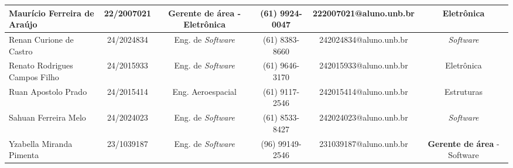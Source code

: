 \begin{landscape}
\begin{table}[htbp]
{\begin{tabular}{|l|c|c|c|c|c|}
Maurício Ferreira de Araújo & 22/2007021 & \textbf{Gerente de área} - Eletrônica & (61) 9924-0047 & 222007021@aluno.unb.br & Eletrônica\\ \hline
Renan Curione de Castro & 24/2024834 & Eng. de \textit{Software} & (61) 8383-8660 & 242024834@aluno.unb.br & \textit{Software}\\ \hline
Renato Rodrigues Campos Filho & 24/2015933 & Eng. de \textit{Software} & (61) 9646-3170 & 242015933@aluno.unb.br & Eletrônica\\ \hline
Ruan Apostolo Prado & 24/2015414 & Eng. Aeroespacial & (61) 9117-2546 & 242015414@aluno.unb.br & Estruturas\\ \hline
Sahuan Ferreira Melo & 24/2024023 & Eng. de \textit{Software} & (61) 8533-8427 & 242024023@aluno.unb.br & \textit{Software}\\ \hline
Yzabella Miranda Pimenta & 23/1039187 & Eng. de \textit{Software} & (96) 99149-2546 & 231039187@aluno.unb.br & \textbf{Gerente de área} - Software\\ \hline
\end{tabular}
}
\end{table}
\end{landscape}

